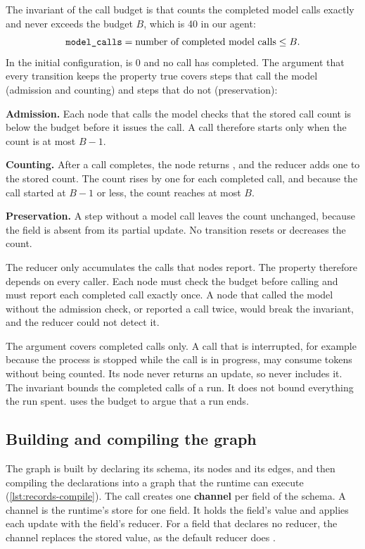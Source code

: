 The invariant of the call budget is that  counts the completed model calls
exactly and never exceeds the budget $B$, which is 40 in our agent:
\begin{equation*}
  \text{\ttfamily model\_calls} = \text{number of completed model calls} \le B.
\end{equation*}
In the initial configuration,  is 0 and no call has completed. The argument
that every transition keeps the property true covers steps that call the model (admission and
counting) and steps that do not (preservation):
\bi
\item \textbf{Admission.} Each node that calls the model checks that the stored call count is
below the budget before it issues the call. A call therefore starts only when the count is at
most $B-1$.
\item \textbf{Counting.} After a call completes, the node returns , and
the reducer adds one to the stored count. The count rises by one for each completed call, and
because the call started at $B-1$ or less, the count reaches at most $B$.
\item \textbf{Preservation.} A step without a model call leaves the count unchanged, because the
field is absent from its partial update. No transition resets or decreases the count.
\ei

The reducer only accumulates the calls that nodes report. The property therefore depends on every
caller. Each node must check the budget before calling and must report each completed call exactly
once. A node that called the model without the admission check, or reported a call twice, would
break the invariant, and the reducer could not detect it.

The argument covers completed calls only. A call that is interrupted, for example because the
process is stopped while the call is in progress, may consume tokens without being counted. Its
node never returns an update, so  never includes it. The invariant bounds the
completed calls of a run. It does not bound everything the run spent.  uses the
budget to argue that a run ends.

\subsection{Building and compiling the graph}
\label{sec:records-compile}

The graph is built by declaring its schema, its nodes and its edges, and then compiling the
declarations into a graph that the runtime can execute (\cref{lst:records-compile}). The call
 creates one \textbf{channel} per field of the schema. A channel is
the runtime's store for one field. It holds the field's value and applies each update with the
field's reducer. For a field that declares no reducer, the channel replaces the stored value, as the
default reducer does \citep{langgraph-pregel}.

